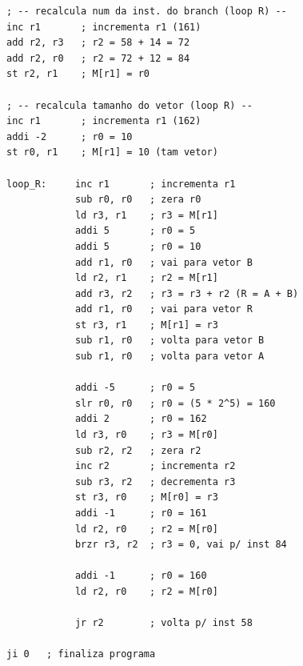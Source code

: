 \documentclass[twocolumn, 11pt]{article}
\begin{document}
\begin{lstlisting}
; -- recalcula num da inst. do branch (loop R) --
inc r1       ; incrementa r1 (161)
add r2, r3   ; r2 = 58 + 14 = 72
add r2, r0   ; r2 = 72 + 12 = 84
st r2, r1    ; M[r1] = r0

; -- recalcula tamanho do vetor (loop R) --
inc r1       ; incrementa r1 (162)
addi -2      ; r0 = 10
st r0, r1    ; M[r1] = 10 (tam vetor)

loop_R:     inc r1       ; incrementa r1
            sub r0, r0   ; zera r0
            ld r3, r1    ; r3 = M[r1]
            addi 5       ; r0 = 5
            addi 5       ; r0 = 10
            add r1, r0   ; vai para vetor B
            ld r2, r1    ; r2 = M[r1]
            add r3, r2   ; r3 = r3 + r2 (R = A + B)
            add r1, r0   ; vai para vetor R
            st r3, r1    ; M[r1] = r3
            sub r1, r0   ; volta para vetor B
            sub r1, r0   ; volta para vetor A

            addi -5      ; r0 = 5
            slr r0, r0   ; r0 = (5 * 2^5) = 160
            addi 2       ; r0 = 162
            ld r3, r0    ; r3 = M[r0]
            sub r2, r2   ; zera r2
            inc r2       ; incrementa r2
            sub r3, r2   ; decrementa r3
            st r3, r0    ; M[r0] = r3
            addi -1      ; r0 = 161
            ld r2, r0    ; r2 = M[r0]
            brzr r3, r2  ; r3 = 0, vai p/ inst 84

            addi -1      ; r0 = 160
            ld r2, r0    ; r2 = M[r0]

            jr r2        ; volta p/ inst 58

ji 0   ; finaliza programa
\end{lstlisting}
\end{document}
